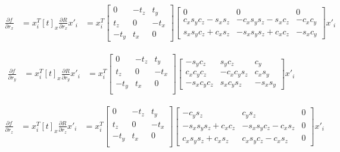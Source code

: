 \documentclass[10pt]{article}         %
\begin{document}
\begin{align*}
  \frac{\partial f}{\partial r_x} 
  &= x_i^T[t]_x\frac{\partial R}{\partial r_x}x'_i
  &= x_i^T\begin{bmatrix} 0 &-t_z &t_y\\t_z &0 &-t_x\\-t_y &t_x &0 \end{bmatrix}
  \begin{bmatrix} 0 & 0 &0\\c_xs_yc_z-s_xs_z &-c_xs_ys_z-s_xc_z &-c_xc_y\\
    s_xs_yc_z+c_xs_z &-s_xs_ys_z+c_xc_z &-s_xc_y \end{bmatrix}x'_i
\end{align*}

\begin{align*}
  \frac{\partial f}{\partial r_y} 
  &= x_i^T[t]_x\frac{\partial R}{\partial r_y}x'_i
  &= x_i^T\begin{bmatrix} 0 &-t_z &t_y\\t_z &0 &-t_x\\-t_y &t_x &0\\ \end{bmatrix}
  \begin{bmatrix} -s_yc_z & s_yc_z &c_y\\c_xc_yc_z &-c_xc_ys_z &c_xs_y\\
    -s_xc_yc_z &s_xc_ys_z &-s_xs_y \end{bmatrix}x'_i
\end{align*}

\begin{align*}
  \frac{\partial f}{\partial r_z} 
  &= x_i^T[t]_x\frac{\partial R}{\partial r_z}x'_i
  &= x_i^T\begin{bmatrix} 0 &-t_z &t_y\\t_z &0 &-t_x\\-t_y &t_x &0\\ \end{bmatrix}
  \begin{bmatrix} -c_ys_z& c_ys_z &0\\-s_xs_ys_z+c_xc_z &-s_xs_yc_z-c_xs_z &0\\
    c_xs_ys_z+c_xs_z &c_xs_yc_z-c_xs_z &0 \end{bmatrix}x'_i
\end{align*}
\end{document}
